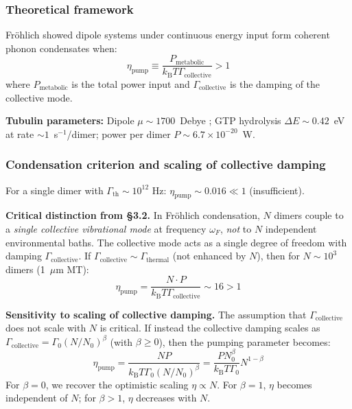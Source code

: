 \documentclass[twocolumn,10pt]{article}
\newcommand{\kB}{k_{\text{B}}}
\newcommand{\Hz}{\text{~Hz}}
\begin{document}
\subsubsection{Theoretical framework}

Fr\"ohlich \cite{Frohlich1968,Frohlich1977} showed dipole systems under
continuous energy input form coherent phonon condensates when:
\begin{equation}
\eta_{\text{pump}} \equiv
\frac{P_{\text{metabolic}}}{\kB T \Gamma_{\text{collective}}} > 1
\end{equation}
where $P_{\text{metabolic}}$ is the total power input and
$\Gamma_{\text{collective}}$ is the damping of the collective mode.

\textbf{Tubulin parameters:} Dipole $\mu \sim 1700$~Debye
\cite{Tuszynski1995}; GTP hydrolysis $\Delta E \sim 0.42$~eV at rate
$\sim 1$~s$^{-1}$/dimer; power per dimer $P \sim 6.7 \times 10^{-20}$~W.


\subsubsection{Condensation criterion and scaling of collective damping}

For a single dimer with $\Gamma_{\text{th}} \sim 10^{12}\Hz$:
$\eta_{\text{pump}} \sim 0.016 \ll 1$ (insufficient).

\textbf{Critical distinction from \S 3.2.} In Fr\"ohlich condensation, $N$
dimers couple to a \textit{single collective vibrational mode} at
frequency $\omega_F$, \textit{not} to $N$ independent environmental baths.
The collective mode acts as a single degree of freedom with damping
$\Gamma_{\text{collective}}$. If $\Gamma_{\text{collective}} \sim
\Gamma_{\text{thermal}}$ (not enhanced by $N$), then for $N \sim 10^3$
dimers (1~$\mu$m MT):
\begin{equation}
\eta_{\text{pump}} = \frac{N \cdot P}{\kB T \Gamma_{\text{collective}}}
\sim 16 > 1
\end{equation}

\textbf{Sensitivity to scaling of collective damping.} The assumption that
$\Gamma_{\text{collective}}$ does not scale with $N$ is critical. If
instead the collective damping scales as $\Gamma_{\text{collective}}
= \Gamma_0 (N/N_0)^\beta$ (with $\beta \ge 0$), then the pumping
parameter becomes:
\begin{equation}
\eta_{\text{pump}} = \frac{N P}{\kB T \Gamma_0 (N/N_0)^\beta}
= \frac{P N_0^\beta}{\kB T \Gamma_0} N^{1-\beta}
\label{eq:eta_pump_beta}
\end{equation}
For $\beta = 0$, we recover the optimistic scaling $\eta \propto N$. For
$\beta = 1$, $\eta$ becomes independent of $N$; for $\beta > 1$, $\eta$
decreases with $N$.
\end{document}
